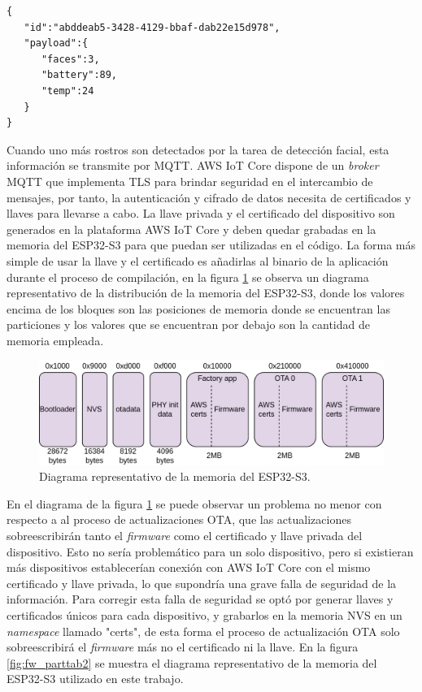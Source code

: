 \begin{lstlisting}[label=cod:message_json,caption=Formato de los mensajes a publicar.]
{
   "id":"abddeab5-3428-4129-bbaf-dab22e15d978",
   "payload":{
      "faces":3,
      "battery":89,
      "temp":24
   }
}
\end{lstlisting}

Cuando uno más rostros son detectados por la tarea de detección facial, esta información se transmite por MQTT. AWS IoT Core dispone de un \textit{broker} MQTT que implementa TLS \cite{tls_doc} para brindar seguridad en el intercambio de mensajes, por tanto, la autenticación y cifrado de datos necesita de certificados y llaves para llevarse a cabo. La llave privada y el certificado del dispositivo son generados en la plataforma AWS IoT Core y deben quedar grabadas en la memoria del ESP32-S3 para que puedan ser utilizadas en el código. La forma más simple de usar la llave y el certificado es añadirlas al binario de la aplicación durante el proceso de compilación, en la figura \ref{fig:fw_parttab1} se observa un diagrama representativo de la distribución de la memoria del ESP32-S3, donde los valores encima de los bloques son las posiciones de memoria donde se encuentran las particiones y los valores que se encuentran por debajo son la cantidad de memoria empleada.

\begin{figure}[h]
	\centering
	\includegraphics[scale=0.22]{./Figures/fw_parttab1.png}
	\caption{Diagrama representativo de la memoria del ESP32-S3.}
	\label{fig:fw_parttab1}
\end{figure}

En el diagrama de la figura \ref{fig:fw_parttab1} se puede observar un problema no menor con respecto a al proceso de actualizaciones OTA, que las actualizaciones sobreescribirán tanto el \textit{firmware} como el certificado y llave privada del dispositivo. Esto no sería problemático para un solo dispositivo, pero si existieran más dispositivos establecerían conexión con AWS IoT Core con el mismo certificado y llave privada, lo que supondría una grave falla de seguridad de la información. Para corregir esta falla de seguridad se optó por generar llaves y certificados únicos para cada dispositivo, y grabarlos en la memoria NVS en un \textit{namespace} llamado "certs", de esta forma el proceso de actualización OTA solo sobreescribirá el \textit{firmware} más no el certificado ni la llave. En la figura \ref{fig:fw_parttab2} se muestra el diagrama representativo de la memoria del ESP32-S3 utilizado en este trabajo.

